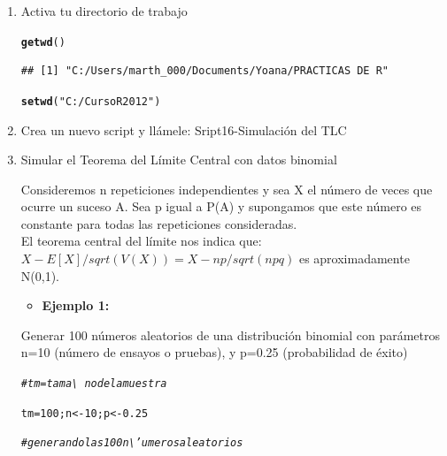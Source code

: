 \documentclass[12pt,letterpaper]{article}\usepackage[]{graphicx}\usepackage[]{color}
\makeatletter
\newcommand{\hlnum}[1]{\textcolor[rgb]{0.686,0.059,0.569}{#1}}%
\newcommand{\hlstr}[1]{\textcolor[rgb]{0.192,0.494,0.8}{#1}}%
\newcommand{\hlcom}[1]{\textcolor[rgb]{0.678,0.584,0.686}{\textit{#1}}}%
\newcommand{\hlstd}[1]{\textcolor[rgb]{0.345,0.345,0.345}{#1}}%
\newcommand{\hlkwb}[1]{\textcolor[rgb]{0.69,0.353,0.396}{#1}}%
\newcommand{\hlkwd}[1]{\textcolor[rgb]{0.737,0.353,0.396}{\textbf{#1}}}%
\newenvironment{kframe}{%
 \def\at@end@of@kframe{}%
 \ifinner\ifhmode%
  \def\at@end@of@kframe{\end{minipage}}%
  \begin{minipage}{\columnwidth}%
 \fi\fi%
 \def\FrameCommand##1{\hskip\@totalleftmargin \hskip-\fboxsep
 \colorbox{shadecolor}{##1}\hskip-\fboxsep
     \hskip-\linewidth \hskip-\@totalleftmargin \hskip\columnwidth}%
 \MakeFramed {\advance\hsize-\width
   \@totalleftmargin\z@ \linewidth\hsize
   \@setminipage}}%
 {\par\unskip\endMakeFramed%
 \at@end@of@kframe}
\newenvironment{knitrout}{}{} %
\makeatother
\begin{document}
\begin{enumerate}
  \item Activa tu directorio de trabajo
\begin{knitrout}
\color{fgcolor}\begin{kframe}
\begin{alltt}
\hlkwd{getwd}\hlstd{()}
\end{alltt}
\begin{verbatim}
## [1] "C:/Users/marth_000/Documents/Yoana/PRACTICAS DE R"
\end{verbatim}
\begin{alltt}
\hlkwd{setwd}\hlstd{(}\hlstr{"C:/Curso R2012"}\hlstd{)}
\end{alltt}
\end{kframe}
\end{knitrout}

\item Crea un nuevo script y ll\'amele: Sript16-Simulaci\'on del TLC

\item Simular el Teorema del L\'imite Central con datos binomial

Consideremos n repeticiones independientes y sea X el n\'umero de veces que ocurre un suceso A. Sea p igual a P(A) y supongamos que este n\'umero es constante para todas las repeticiones consideradas.\\

El teorema central del l\'imite nos indica que:\\
$X-E[X]/sqrt(V(X))=X-np/sqrt(npq)$ es aproximadamente N(0,1).\\

\begin{itemize}
  \item \textbf{Ejemplo 1:}
\end{itemize}
Generar 100 n\'umeros aleatorios de una distribuci\'on binomial con par\'ametros n=10 (n\'umero de ensayos o pruebas), y p=0.25 (probabilidad de \'exito)
\begin{knitrout}
\color{fgcolor}\begin{kframe}
\begin{alltt}
\hlcom{# tm= tama\textbackslash{}~no de la muestra}

\hlstd{tm}\hlkwb{=}\hlnum{100}\hlstd{; n} \hlkwb{<-} \hlnum{10}\hlstd{; p} \hlkwb{<-} \hlnum{0.25}

\hlcom{# generando las 100 n\textbackslash{}'umeros aleatorios}


\end{alltt}
\end{kframe}
\end{knitrout}
\end{enumerate}
\end{document}
